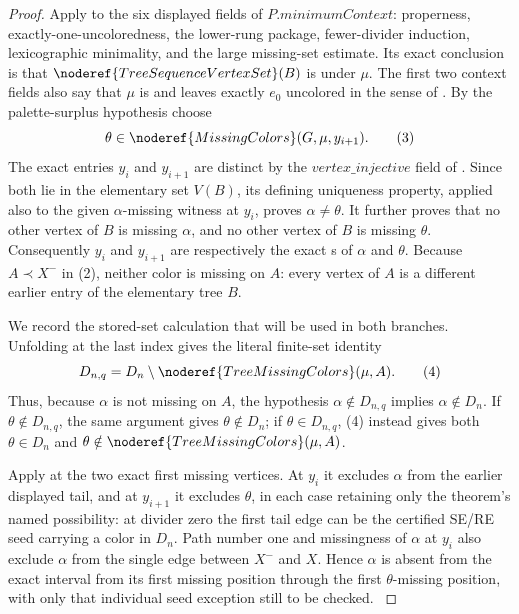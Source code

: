 \begin{proof}
Apply  to the six
displayed fields of \(P.\mathit{minimumContext}\): properness,
exactly-one-uncoloredness, the lower-rung package, fewer-divider induction,
lexicographic minimality, and the large missing-set estimate.  Its exact
conclusion is that \(\noderef{TreeSequenceVertexSet}(B)\) is
 under \(\mu\).  The first two context
fields also say that \(\mu\) is  and leaves
exactly \(e_0\) uncolored in the sense of
.  By the palette-surplus hypothesis choose
\[
             \theta\in\noderef{MissingColors}(G,\mu,y_{i+1}). \tag{3}
\]
The exact entries \(y_i\) and \(y_{i+1}\) are distinct by the
\(\mathit{vertex\_injective}\) field of .  Since
both lie in the elementary set \(V(B)\), its defining uniqueness property,
applied also to the given \(\alpha\)-missing witness at \(y_i\), proves
\(\alpha\ne\theta\).  It further proves that no other vertex of \(B\) is
missing \(\alpha\), and no other vertex of \(B\) is missing \(\theta\).
Consequently \(y_i\) and \(y_{i+1}\) are respectively the exact
s of \(\alpha\) and \(\theta\).
Because \(A\prec X^-\) in (2), neither color is missing on \(A\): every
vertex of \(A\) is a different earlier entry of the elementary tree
\(B\).

We record the stored-set calculation that will be used in both branches.
Unfolding  at the last index gives the
literal finite-set identity
\[
 D_{n,q}=D_n\setminus\noderef{TreeMissingColors}(\mu,A).       \tag{4}
\]
Thus, because \(\alpha\) is not missing on \(A\), the hypothesis
\(\alpha\notin D_{n,q}\) implies \(\alpha\notin D_n\).  If
\(\theta\notin D_{n,q}\), the same argument gives
\(\theta\notin D_n\); if \(\theta\in D_{n,q}\), (4) instead gives both
\(\theta\in D_n\) and \(\theta\notin\noderef{TreeMissingColors}(\mu,A)\).

Apply  at the two exact first
missing vertices.  At \(y_i\) it excludes \(\alpha\) from the earlier
displayed tail, and at \(y_{i+1}\) it excludes \(\theta\), in each case
retaining only the theorem's named possibility: at divider zero the first
tail edge can be the certified SE/RE seed carrying a color in \(D_n\).
Path number one and missingness of \(\alpha\) at \(y_i\) also exclude
\(\alpha\) from the single edge between \(X^-\) and \(X\).  Hence
\(\alpha\) is absent from the exact interval from its first missing
position through the first \(\theta\)-missing position, with only that
individual seed exception still to be checked.                         \(\tag{5}\)


\end{proof}
